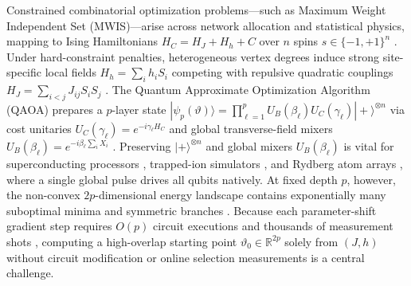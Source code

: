 \documentclass[10pt,a4paper]{article}
\begin{document}
Constrained combinatorial optimization problems---such as Maximum Weight Independent Set (MWIS)---arise across network allocation and statistical physics, mapping to Ising Hamiltonians $H_C = H_J + H_h + C$ over $n$ spins $s \in \{-1, +1\}^n$ \citep{lucas2014ising,pichler2018quantum,ebadi2022quantum}. Under hard-constraint penalties, heterogeneous vertex degrees induce strong site-specific local fields $H_h = \sum_i h_i S_i$ competing with repulsive quadratic couplings $H_J = \sum_{i<j} J_{ij} S_i S_j$ \citep{hadfield2019quantum}. The Quantum Approximate Optimization Algorithm (QAOA) prepares a $p$-layer state $|\psi_p(\vartheta)\rangle = \prod_{\ell=1}^p U_B(\beta_\ell) U_C(\gamma_\ell) |+\rangle^{\otimes n}$ via cost unitaries $U_C(\gamma_\ell) = e^{-i\gamma_\ell H_C}$ and global transverse-field mixers $U_B(\beta_\ell) = e^{-i\beta_\ell \sum_i X_i}$ \citep{farhi2014quantum,preskill2018quantum,cerezo2021variational,blekos2024review}. Preserving $|+\rangle^{\otimes n}$ and global mixers $U_B(\beta_\ell)$ is vital for superconducting processors \citep{harrigan2021quantum}, trapped-ion simulators \citep{pagano2020quantum}, and Rydberg atom arrays \citep{ebadi2022quantum}, where a single global pulse drives all qubits natively. At fixed depth $p$, however, the non-convex $2p$-dimensional energy landscape contains exponentially many suboptimal minima and symmetric branches \citep{mcclean2018barren,shaydulin2019multistart,lotshaw2021empirical,shaydulin2021classical,you2021exponentially,bittel2021training,anschuetz2022quantum}. Because each parameter-shift gradient step requires $O(p)$ circuit executions and thousands of measurement shots \citep{mitarai2018quantum,wierichs2022general}, computing a high-overlap starting point $\vartheta_0 \in \mathbb{R}^{2p}$ solely from $(J, h)$ without circuit modification or online selection measurements is a central challenge.
\end{document}
